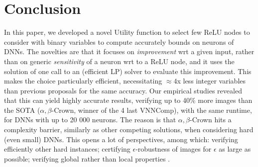 \documentclass{llncs}
\newcommand{\ReLU}{\mathrm{ReLU}}
\begin{document}
\iffalse
In some cases, the output is a vector but the aim to get the label of dimension with the minimal value. In this case, the problem can be written as:\begin{align*}
	\forall \boldsymbol{x} \in\mathcal{D} \  \min f(\boldsymbol{x}) = \min f(\boldsymbol{x}_0)
\end{align*}

If so, the question of verification can turn to the following optimization question: \begin{align*}
	\min f(\boldsymbol{x}) \ s.t. {\boldsymbol{z}}^{i} &= \boldsymbol{W}^i\cdot \hat{\boldsymbol{z}}^{(i-1)}+ b^i\\
	\hat{\boldsymbol{z}}^{i}(n) &= \sigma({\boldsymbol{z}}^i(n)), \boldsymbol{x}\in\mathcal{D}.
\end{align*}

In this paper, we only consider $\ReLU$ function as the activation function: $\sigma(a)=\ReLU(a)=\max(0,a)$. 

In this paper, we consider $L^{\infty}$ norm the max value of distance of each dimension, that is $d(\vx,\boldsymbol{x}_0)=\max |\boldsymbol{x}(n)-\boldsymbol{x}_0(n)|$. 
\fi

















\section{Conclusion}
{\color{blue}
	In this paper, we developed a novel Utility function to select few ReLU nodes to consider with binary variables to compute accurately bounds on neurons of DNNs. The novelties are that it focuses on {\em improvement} wrt a given input, rather than on generic {\em sensitivity} of a neuron wrt to a ReLU node, and it uses the solution of one call to an (efficient LP) solver to evaluate this improvement. This makes the choice particularly efficient, necessitating $\approx4$x less integer variables than previous proposals \cite{DivideAndSlide} for the same accuracy.} 
Our empirical studies revealed that this can yield highly accurate results, verifying up to 40\% more images than the SOTA ($\alpha,\beta$-Crown, winner of the 4 last VNNComp), with the same runtime, for DNNs with up to 20 000 neurons. 
The reason is that $\alpha,\beta$-Crown hits a complexity barrier, similarly as other competing solutions, when considering hard (even small) DNNs. This opens a lot of perspectives, among which: verifying efficiently other hard instances; certifying $\epsilon$-robustness of images for $\epsilon$ as large as possible; 
verifying global rather than local properties \cite{lipshitz}.
\end{document}
